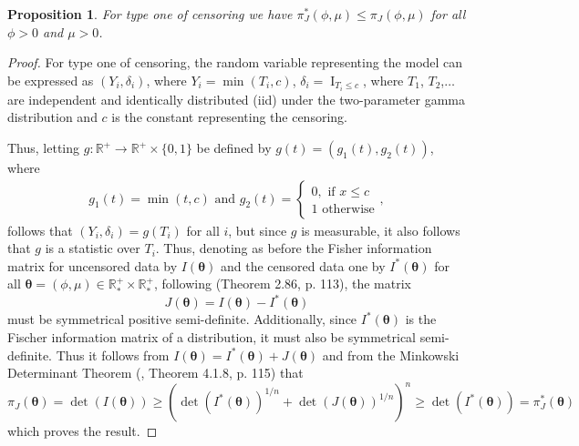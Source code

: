 \documentclass[12pt]{article} %
\newcommand{\f}{\operatorname}
\newcommand{\R}{\mathbb{R}}
\theoremstyle{plain}%
\newtheorem{proposition}[theorem]{Proposition}
\theoremstyle{definition}
\theoremstyle{remark}
\begin{document}
\begin{proposition}\label{jeffreycens} For type one of censoring we have $\pi_{J}^*(\phi,\mu)\leq \pi_J(\phi,\mu)$ for all $\phi>0$ and $\mu>0$.
\end{proposition}
\begin{proof} For type one of censoring, the random variable representing the model can be expressed as $(Y_i,\delta_i)$, where $Y_i=\min(T_i,c)$, $\delta_i=\f{I}_{T_i\leq c}$, where $T_1$, $T_2$,$\ldots$ are independent and identically distributed (iid) under the two-parameter gamma distribution and $c$ is the constant representing the censoring.

Thus, letting $g:\R^+\to \R^+\times \{0,1\}$ be defined by $g(t)=(g_1(t),g_2(t))$, where
\begin{equation*}
\begin{aligned}
g_1(t) = \min(t,c)\mbox{ and }
g_2(t) = \begin{cases}0,\mbox{ if }x\leq c\\
1\mbox{ otherwise}
\end{cases},
\end{aligned}
\end{equation*}
follows that $(Y_i,\delta_i) = g(T_i)$ for all $i$, but since $g$ is measurable, it also follows that $g$ is a statistic over $T_i$. Thus, denoting as before the Fisher information matrix for uncensored data by $I(\boldsymbol{\theta})$ and the censored data one by $I^*(\boldsymbol{\theta})$ for all $\boldsymbol{\theta}=(\phi,\mu)\in \R^+_*\times \R^+_*$, following \cite{2013-Schervish} (Theorem 2.86, p. 113), the matrix
\begin{equation*} J(\boldsymbol{\theta})=I(\boldsymbol{\theta})-I^*(\boldsymbol{\theta})
\end{equation*}
must be symmetrical positive semi-definite. Additionally, since $I^*(\boldsymbol{\theta})$ is the Fischer information matrix of a distribution, it must also be symmetrical semi-definite. Thus it follows from $I(\boldsymbol{\theta})=I^*(\boldsymbol{\theta})+J(\boldsymbol{\theta})$ and from the Minkowski Determinant Theorem  (\cite{2010-Marcus}, Theorem 4.1.8, p. 115) that
\begin{equation*} \pi_{J}(\boldsymbol{\theta})=\det(I(\boldsymbol{\theta})) \geq \left(\det\left(I^*(\boldsymbol{\theta})\right)^{1/n} + \det\left(J(\boldsymbol{\theta})\right)^{1/n}\right)^n\geq \det(I^*(\boldsymbol{\theta}))=\pi_{J}^*(\boldsymbol{\theta}) 
\end{equation*}
which proves the result.
\end{proof}
\end{document}
